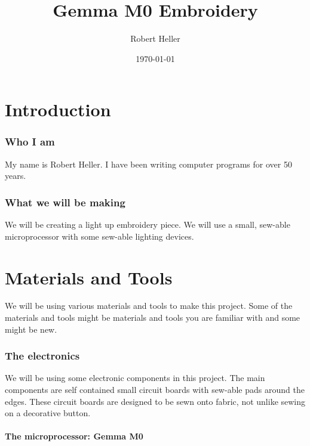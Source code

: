 \documentclass[letterpaper,twoside,12pt]{article}
\title{Gemma M0 Embroidery}
\author{Robert Heller}
\date{\today}
\begin{document}
\maketitle

\tableofcontents

\part{Introduction}
\section{Who I am}

My name is Robert Heller.  I have been writing computer programs for over 50
years.

\section{What we will be making}

We will be creating a light up embroidery piece.  We will use a small, 
sew-able microprocessor with some sew-able lighting devices.

\part{Materials and Tools}

We will be using various materials and tools to make this project.  Some of 
the materials and tools might be materials and tools you are familiar with and 
some might be new.

\section{The electronics}

We will be using some electronic components in this project.  The main 
components are self contained small circuit boards with sew-able pads around 
the edges.  These circuit boards are designed to be sewn onto fabric, not 
unlike sewing on a decorative button.

\subsection{The microprocessor: Gemma M0}
\end{document}
